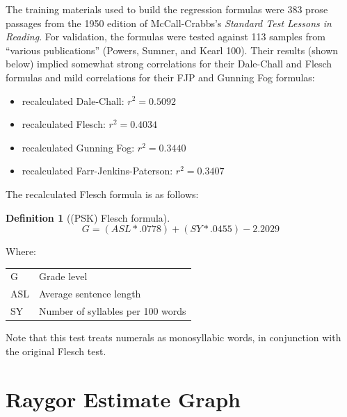 \documentclass[
]{book}
\providecommand{\tightlist}{%
  \setlength{\itemsep}{0pt}\setlength{\parskip}{0pt}}
\theoremstyle{definition}
\newtheorem{definition}{Definition}[chapter]
\theoremstyle{definition}
\theoremstyle{definition}
\theoremstyle{definition}
\theoremstyle{remark}
\begin{document}
The training materials used to build the regression formulas were 383 prose passages from the 1950 edition of McCall-Crabbs's \emph{Standard Test Lessons in Reading}. For validation, the formulas were tested against 113 samples from ``various publications'' (Powers, Sumner, and Kearl 100). Their results (shown below) implied somewhat strong correlations for their Dale-Chall and Flesch formulas and mild correlations for their FJP and Gunning Fog formulas:

\begin{itemize}
\tightlist
\item
  recalculated Dale-Chall: \(r^2 = 0.5092\)
\item
  recalculated Flesch: \(r^2 = 0.4034\)
\item
  recalculated Gunning Fog: \(r^2 = 0.3440\)
\item
  recalculated Farr-Jenkins-Paterson: \(r^2 = 0.3407\)
\end{itemize}

The recalculated Flesch formula is as follows:

\begin{definition}[(PSK) Flesch formula]
\protect\hypertarget{def:pskflesch}{}{\label{def:pskflesch} {} }\[
G = (ASL * .0778) + (SY * .0455) - 2.2029
\]
\end{definition}

Where:

\begin{longtable}[]{@{}
  >{\raggedright\arraybackslash}p{}
  >{\raggedright\arraybackslash}p{}@{}}
\toprule
\endhead
G & Grade level \\
ASL & Average sentence length \\
SY & Number of syllables per 100 words \\
\bottomrule
\end{longtable}

Note that this test treats numerals as monosyllabic words, in conjunction with the original Flesch test.


\newpage

\hypertarget{raygor-test}{%
\section{\texorpdfstring{Raygor Estimate Graph}{Raygor Estimate Graph}}\label{raygor-test}}
\end{document}
